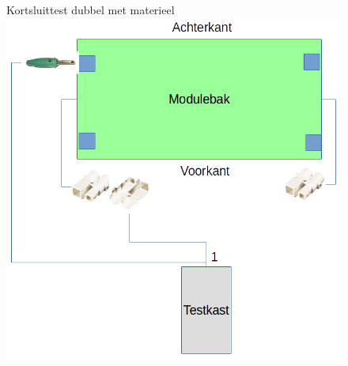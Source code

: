 \documentclass[12pt,a4paper]{report}
\begin{document}
\begin{figure}[!ht]
  \captionbox
  {Kortsluittest dubbel met materieel\label{im:test_dubbel_met}}
  {\includegraphics[scale=0.8]{images/rcu_test_dubbel_met}\\}
\end{figure}
\end{document}
